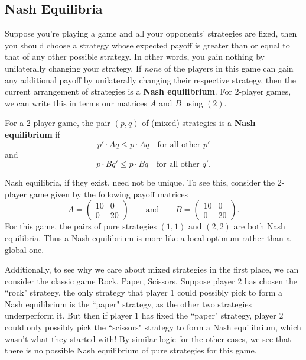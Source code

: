 \documentclass[twoside,10pt]{article}
\begin{document}
\subsection{Nash Equilibria}

Suppose you're playing a game and all your opponents' strategies are fixed, then you should choose a strategy whose expected payoff is greater than or equal to that of any other possible strategy. In other words, you gain nothing by unilaterally changing your strategy. If \textit{none} of the players in this game can gain any additional payoff by unilaterally changing their respective strategy, then the current arrangement of strategies is a \textbf{Nash equilibrium}. For 2-player games, we can write this in terms our matrices $A$ and $B$ using $(2)$.

\begin{defn}[]
	For a 2-player game, the pair $(p,q)$ of (mixed) strategies is a \textbf{Nash equilibrium} if
	\[
		p' \cdot Aq \leq p \cdot Aq \quad \text{for all other } p'
	\] 
	and
	\[
                p \cdot Bq' \leq p \cdot Bq \quad \text{for all other } q'.
        \]
\end{defn}

Nash equilibria, if they exist, need not be unique. To see this, consider the 2-player game given by the following payoff matrices
\[
A=
\begin{pmatrix}
	10&0\\
	0&20
\end{pmatrix}
\qquad\text{and}\qquad
B=
\begin{pmatrix}
	10&0\\
	0&20
\end{pmatrix}.
\] 
For this game, the pairs of pure strategies $(1,1)$ and $(2,2)$ are both Nash equilibria. Thus a Nash equilibrium is more like a local optimum rather than a global one.

Additionally, to see why we care about mixed strategies in the first place, we can consider the classic game Rock, Paper, Scissors. Suppose player 2 has chosen the ``rock" strategy, the only strategy that player 1 could possibly pick to form a Nash equilibrium is the ``paper" strategy, as the other two strategies underperform it. But then if player 1 has fixed the ``paper" strategy, player 2 could only possibly pick the ``scissors" strategy to form a Nash equilibrium, which wasn't what they started with! By similar logic for the other cases, we see that there is no possible Nash equilibrium of pure strategies for this game.
\end{document}
